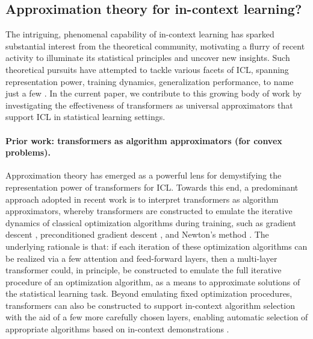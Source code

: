 \documentclass[english]{article}
\begin{document}
\subsection{Approximation theory for in-context learning?}


The intriguing, phenomenal capability of in-context learning has sparked substantial interest from the theoretical community, 
motivating a flurry of recent activity to illuminate its statistical principles and uncover new insights. Such theoretical pursuits have attempted to tackle various facets of ICL, spanning representation power, training dynamics, generalization performance, to name just a few \citep{garg2022can,von2023transformers,von2023uncovering,ahn2023transformers,bai2023transformers}. 
In the current paper, we contribute to this growing body of work by investigating the effectiveness of transformers as universal approximators that support ICL in statistical learning settings. 



\paragraph{Prior work: transformers as algorithm approximators (for convex problems).}
%
Approximation theory has emerged as a powerful lens for demystifying the representation power of transformers for ICL. 
Towards this end, a predominant approach adopted in recent work is to interpret transformers as algorithm approximators, whereby  transformers are constructed to emulate the iterative dynamics of classical optimization algorithms during training, such as gradient descent \citep{von2023transformers}, preconditioned gradient descent \citep{ahn2023transformers}, 
and Newton's method  \citep{giannou2023looped,fu2024transformers}. 
The underlying rationale is that: if each iteration of these optimization algorithms can be realized via a few attention and feed-forward layers, then a multi-layer transformer could, in principle, be constructed to emulate the full iterative procedure of an optimization algorithm,  as a means to approximate solutions of the statistical learning task. 
%
Beyond emulating fixed optimization procedures, transformers can also be constructed to support in-context algorithm selection with the aid of a few more carefully chosen layers, enabling automatic selection of appropriate algorithms based on in-context demonstrations \citep{bai2023transformers,hataya2024automatic}. 
\end{document}
